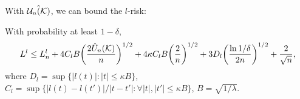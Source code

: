With $\hat{{\cal U}_n({\cal K})}$, we can bound the $l$-risk:
\begin{theorem} \label{thm:bnd-rdmchr-chaos} \cite{colt/YingC09}
With probability at least $1 - \delta$,
\[
L^{l} \leq L^{l}_n + 4C_{l}B\bigg(\frac{2\hat{U}_n({\cal K})}{n}\bigg)^{1/2}
 + 4\kappa C_l B\bigg(\frac{2}{n}\bigg)^{1/2} + 3D_{l}\bigg(\frac{\ln 1 / \delta}{2n}\bigg)^{1/2}
  + \frac{2}{\sqrt{n}},
\]
where $D_{l} = \sup\{|l(t)| : |t| \leq \kappa B\}$, $C_{l} = \sup\{|l(t) -
l(t')|/|t - t'|: \forall |t|,|t'| \leq \kappa B\}$, $B = \sqrt{1 / \lambda}$.
\end{theorem}
